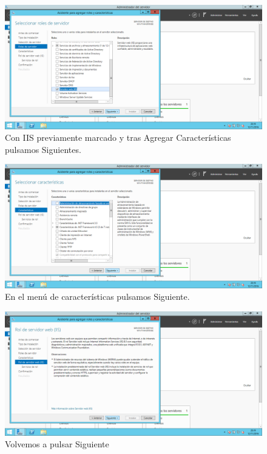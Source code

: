 \begin{flushleft}
\begin{figure}[H]
	\centering
	\includegraphics[scale=0.4]{iis5.png}
	\caption{Con IIS previamente marcado y tras Agregar Características pulsamos Siguientes.}
\end{figure}

\begin{figure}[H]
	\centering
	\includegraphics[scale=0.4]{iis6.png}
	\caption{En el menú de características pulsamos Siguiente.}
\end{figure}

\begin{figure}[H]
	\centering
	\includegraphics[scale=0.4]{iis7.png}
	\caption{Volvemos a pulsar Siguiente}
\end{figure}


\end{flushleft}
